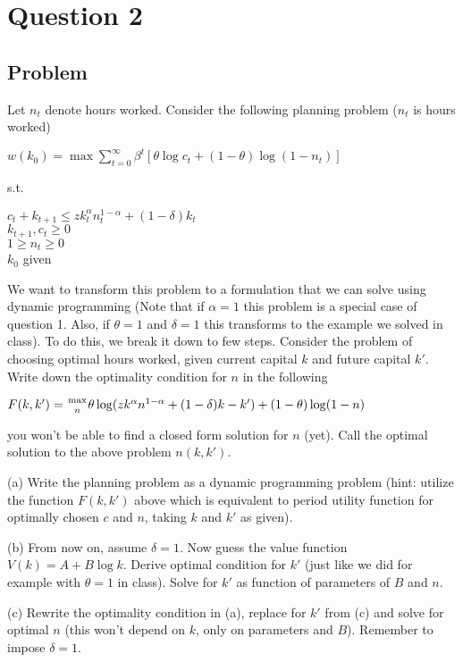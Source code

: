 \documentclass[10pt, a4paper]{article}
\begin{document}
\section*{Question 2}
  \subsection*{Problem}
    Let $n_t$ denote hours worked. Consider the following planning problem ($n_t$ is hours worked)
    \begin{center}
      $w(k_0) = \max\sum_{t=0}^{\infty}\beta^t[\theta\log c_t+(1-\theta)\log(1-n_t)]$
    \end{center}
    s.t.
    \begin{center}
      $c_t+k_{t+1}\leq zk_t^{\alpha}n_t^{1-\alpha}+(1-\delta)k_t$ \\
      $k_{t+1},c_t\geq 0$ \\
      $1\geq n_t\geq 0$ \\
      $k_0$ given
    \end{center}

    We want to transform this problem to a formulation that we can solve using dynamic programming (Note that if $\alpha=1$ this problem is a special case of question 1. Also, if $\theta=1$ and $\delta=1$ this transforms to the example we solved in class). To do this, we break it down to few steps. Consider the problem of choosing optimal hours worked, given current capital $k$ and future capital $k'$. Write down the optimality condition for $n$ in the following
    \begin{center}
      $F(k,k')={\max\atop{n}}\theta\log(zk^{\alpha}n^{1-\alpha}+(1-\delta)k-k')+(1-\theta)\log(1-n)$
    \end{center}
    you won't be able to find a closed form solution for $n$ (yet). Call the optimal solution to the above problem $n(k,k')$.

    (a) Write the planning problem as a dynamic programming problem (hint: utilize the function $F(k,k')$ above which is equivalent to period utility function for optimally chosen $c$ and $n$, taking $k$ and $k'$ as given).

    (b) From now on, assume $\delta=1$. Now guess the value function $V(k)=A+B\log k$. Derive optimal condition for $k'$ (just like we did for example with $\theta=1$ in class). Solve for $k'$ as function of parameters of $B$ and $n$.

    (c) Rewrite the optimality condition in (a), replace for $k'$ from (c) and solve for optimal $n$ (this won't depend on $k$, only on parameters and $B$). Remember to impose $\delta=1$.
\end{document}
